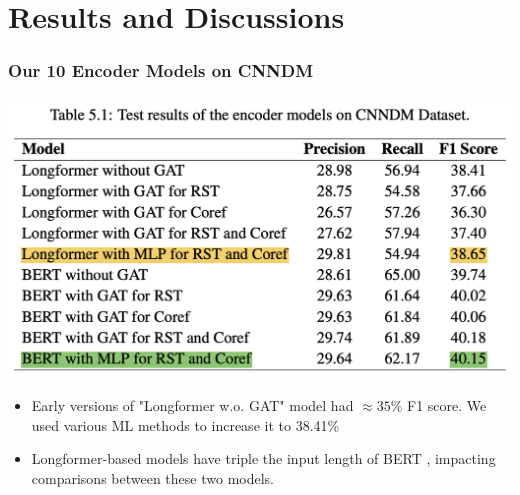 \documentclass{beamer}
\begin{document}
\section{Results and Discussions}

\begin{frame}
\frametitle{Our 10 Encoder Models on CNNDM}

   \begin{minipage}[t][0.45\textheight][t]{\textwidth}
      \centering
      \includegraphics[scale=.33]{imgs/table51_highlight.png}
  \end{minipage}


  \begin{minipage}[t][0.55\textheight][t]{\textwidth}
    \begin{itemize}
      \item Early versions of "Longformer w.o. GAT" model had $ \approx 35 \% $ F1 score. We used various ML methods to increase it to 38.41\%
      \item Longformer-based models {\tiny \cite{longformer}} have triple the input length of BERT  {\tiny \cite{bert}}, impacting comparisons between these two models.
    \end{itemize}
  \end{minipage}
 
\end{frame}
\end{document}
